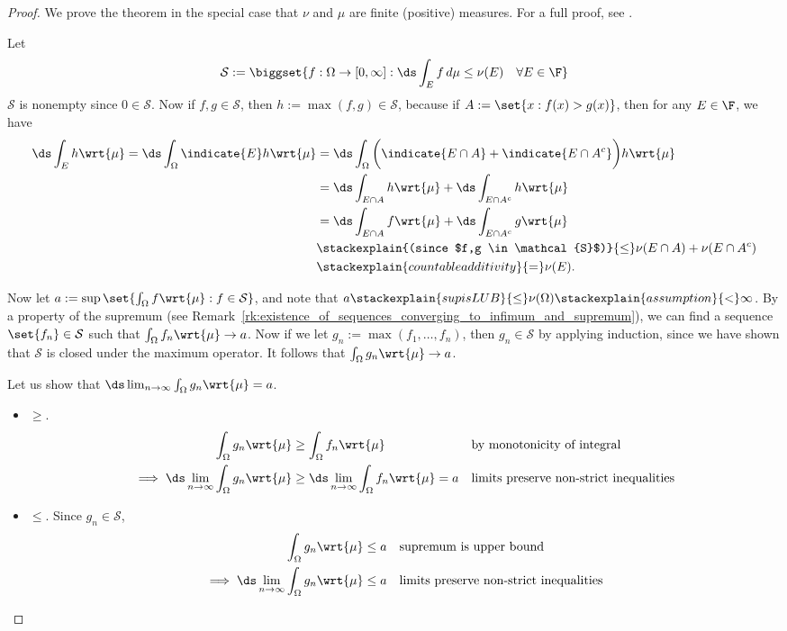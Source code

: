 \documentclass{article} %
\newcommand{\dmu}{\wrt{\mu}}
\begin{document}
\begin{proof}
We prove the theorem in the special case that $\nu$ and $\mu$ are finite (positive) measures.  For a full proof, see \cite[pp.~90]{folland1999real}.
	
Let 
\[ \mathcal{S} := \biggset{ f : \Omega \to [0,\infty] : \ds\int_E f \, d\mu \leq \nu(E) \quad \forall E \in \F}\]
$\mathcal{S}$ is nonempty since $0 \in \mathcal{S}$.  Now if $f,g \in \mathcal{S}$, then $h:=\max(f,g) \in \mathcal{S}$, because if $A:=\set{x: f(x) > g(x)}$, then for any $E \in \F$, we have
\begin{align*}
\ds\int_E h \dmu = \ds\int_\Omega \indicate{E} h \dmu &= \ds\int_\Omega \bigg( \indicate{E \cap A} + \indicate{E \cap A^c}  \bigg) h \dmu  \\
&= \ds\int_{E \cap A} h \dmu +  \ds\int_{E \cap A^c} h \dmu \\
&= \ds\int_{E \cap A} f \dmu +  \ds\int_{E \cap A^c} g \dmu \\
& \stackexplain{(since $f,g \in \mathcal{S}$)}{\leq} \nu(E \cap A) + \nu(E \cap A^c) \\
& \stackexplain{countable additivity}{=} \nu(E). 
\end{align*}

Now let $a:=\sup \set{\int_\Omega f \dmu : f \in \mathcal{S}}$, and note that $a \stackexplain{sup is LUB}{\leq} \nu(\Omega) \stackexplain{assumption}{<} \infty$.  By a property of the supremum (see Remark~\ref{rk:existence_of_sequences_converging_to_infimum_and_supremum}), we can find a sequence $\set{f_n} \in \mathcal{S}$ such that $\int_\Omega f_n \dmu \to a$.  Now if we let $g_n := \max (f_1,\hdots, f_n)$, then $g_n \in \mathcal{S}$ by applying induction, since we have shown that $\mathcal{S}$ is closed under the maximum operator. It follows that $\int_\Omega g_n \dmu \to a$.

{\tiny 
Let us show that $\ds\lim_{n \to \infty} \int_\Omega g_n \dmu = a$.

\begin{itemize}
\item $\boxed{\geq}$.
\begin{align*}
\int_\Omega g_n \dmu &\geq \int_\Omega f_n \dmu && \text{by monotonicity of integral} \\
\implies \ds\lim_{n \to \infty} \int_\Omega g_n \dmu &\geq \ds\lim_{n \to \infty}  \int_\Omega f_n \dmu  = a && \text{limits preserve non-strict inequalities}
\end{align*}

\item 	$\boxed{\leq}$. Since $g_n \in \mathcal{S}$,
\begin{align*}
\int_\Omega g_n \dmu &\leq a && \text{supremum is upper bound} \\
\implies \ds\lim_{n \to \infty} \int_\Omega g_n \dmu &\leq a && \text{limits preserve non-strict inequalities}
\end{align*}
\end{itemize}
}


\end{proof}
\end{document}

